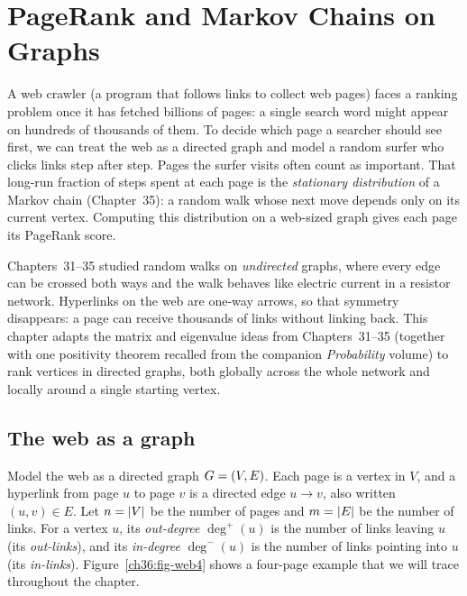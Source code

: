 \chapter{PageRank and Markov Chains on Graphs}
\label{ch:pagerank}

A web crawler (a program that follows links to collect web pages) faces a ranking problem once it has fetched billions of pages: a single search word might appear on hundreds of thousands of them. To decide which page a searcher should see first, we can treat the web as a directed graph and model a random surfer who clicks links step after step. Pages the surfer visits often count as important. That long-run fraction of steps spent at each page is the \emph{stationary distribution} of a Markov chain (Chapter~35): a random walk whose next move depends only on its current vertex. Computing this distribution on a web-sized graph gives each page its PageRank score.

\begin{connectionbox}
Chapters~31--35 studied random walks on \emph{undirected} graphs, where every edge can be crossed both ways and the walk behaves like electric current in a resistor network. Hyperlinks on the web are one-way arrows, so that symmetry disappears: a page can receive thousands of links without linking back. This chapter adapts the matrix and eigenvalue ideas from Chapters~31--35 (together with one positivity theorem recalled from the companion \emph{Probability} volume) to rank vertices in directed graphs, both globally across the whole network and locally around a single starting vertex.
\end{connectionbox}

\section{The web as a graph}
\label{ch36:web-graph}

Model the web as a directed graph $G = (V, E)$. Each page is a vertex in $V$, and a hyperlink from page $u$ to page $v$ is a directed edge $u \to v$, also written $(u,v) \in E$. Let $n = \lvert V\rvert$ be the number of pages and $m = \lvert E\rvert$ be the number of links. For a vertex $u$, its \emph{out-degree} $\deg^+(u)$ is the number of links leaving $u$ (its \emph{out-links}), and its \emph{in-degree} $\deg^-(u)$ is the number of links pointing into $u$ (its \emph{in-links}). Figure~\ref{ch36:fig-web4} shows a four-page example that we will trace throughout the chapter.

